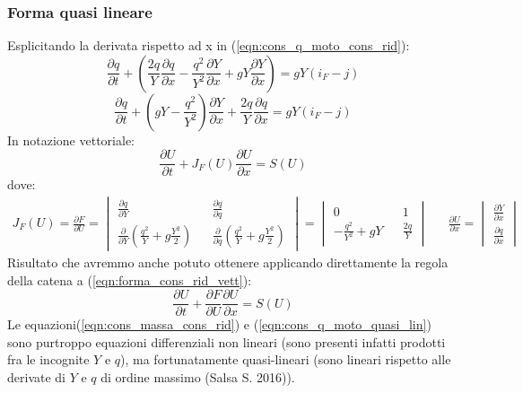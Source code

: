 \documentclass[12pt]{article} %
\begin{document}
\subsubsection{Forma quasi lineare}
\noindent Esplicitando la derivata rispetto ad x in (\ref{eqn:cons_q_moto_cons_rid}):
\begin{equation*}
    \frac{\partial q }{\partial t}+\left(\frac{2q}{Y}\frac{\partial q}{\partial x}-\frac{q^2}{Y^2}\frac{\partial Y}{\partial x}+gY\frac{\partial Y}{\partial x}\right)={gY\left(i_F-j\right)}
\end{equation*}
\begin{equation}
    \frac{\partial q }{\partial t}+\left(gY-\frac{q^2}{Y^2}\right)\frac{\partial Y}{\partial x}+\frac{2q}{Y}\frac{\partial q}{\partial x}={gY\left(i_F-j\right)}
    \label{eqn:cons_q_moto_quasi_lin}
\end{equation}
\noindent In notazione vettoriale:
\begin{equation}
    \frac{\partial U}{\partial t}+J_F(U)\frac{\partial U}{\partial x}  = S(U)
    \label{eqn:forma_quasi_lin_vett_jacob}
\end{equation}
\noindent dove:
\begin{align*}
    J_F(U) =\frac{\partial F}{\partial U} = \begin{vmatrix}\frac{\partial q}{\partial Y} && \frac{\partial q}{\partial q} \\ \frac{\partial }{\partial Y}\left(\frac{q^2}{Y}+g\frac{Y^2}{2}\right) && \frac{\partial }{\partial q}\left(\frac{q^2}{Y}+g\frac{Y^2}{2}\right)\end{vmatrix} = \begin{vmatrix}0 && 1 \\ -\frac{q^2}{Y^2}+gY && \frac{2q}{Y}\end{vmatrix} && \frac{\partial U}{\partial x}=\begin{vmatrix}\frac{\partial Y}{\partial x}\\\frac{\partial q}{\partial x}\end{vmatrix}
\end{align*}
\noindent Risultato che avremmo anche potuto ottenere applicando direttamente la regola della catena a (\ref{eqn:forma_cons_rid_vett}):
\begin{equation}
    \frac{\partial U}{\partial t}+\frac{\partial F}{\partial U}\frac{\partial U}{\partial x}  = S(U)
    \label{eqn:forma_quasi_lin_vett_catena}
\end{equation}
\noindent Le equazioni(\ref{eqn:cons_massa_cons_rid}) e (\ref{eqn:cons_q_moto_quasi_lin}) sono purtroppo equazioni differenziali non lineari (sono presenti infatti prodotti fra le incognite $Y$ e $q$), ma fortunatamente quasi-lineari (sono lineari rispetto alle derivate di $Y$ e $q$ di ordine massimo (Salsa S. 2016)). 
\end{document}
